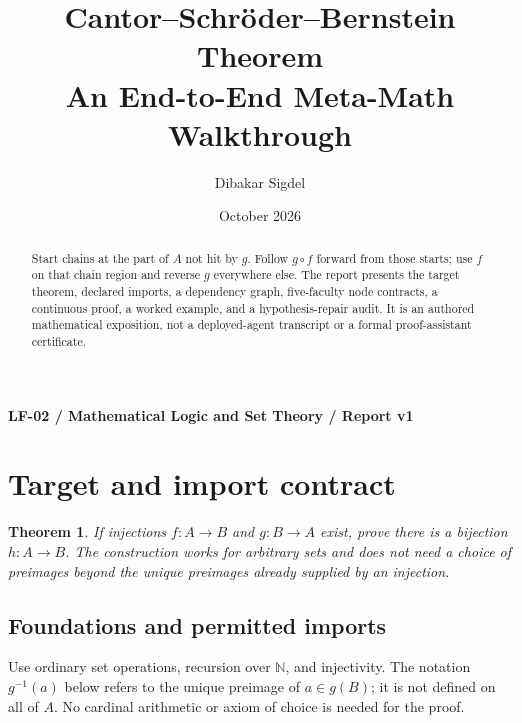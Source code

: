 \documentclass[preprint,12pt,aps,pra,showkeys,amsmath,amssymb,superscriptaddress,floatfix]{revtex4-2}
\newtheorem{theorem}{Theorem}[section]
\theoremstyle{definition}
\theoremstyle{remark}
\begin{document}
\title{Cantor--Schröder--Bernstein Theorem\\[4pt]\large An End-to-End Meta-Math Walkthrough}

\author{Dibakar Sigdel}


\date{October 2026}

\begin{abstract}

Start chains at the part of \(A\) not hit by \(g\). Follow \(g\circ f\)
forward from those starts; use \(f\) on that chain region and reverse
\(g\) everywhere else. The report presents the target theorem, declared
imports, a dependency graph, five-faculty node contracts, a continuous
proof, a worked example, and a hypothesis-repair audit. It is an
authored mathematical exposition, not a deployed-agent transcript or a
formal proof-assistant certificate.

\end{abstract}\maketitle\linespread{1.12}\selectfont

\noindent\textbf{LF-02 / Mathematical Logic and Set Theory / Report v1}

\section{Target and import contract}

\begin{theorem}

If injections \(f:A\to B\) and \(g:B\to A\) exist, prove there is a
bijection \(h:A\to B\). The construction works for arbitrary sets and
does not need a choice of preimages beyond the unique preimages already
supplied by an injection.

\end{theorem}

\subsection{Foundations and permitted imports}

Use ordinary set operations, recursion over \(\mathbb N\), and
injectivity. The notation \(g^{-1}(a)\) below refers to the unique
preimage of \(a\in g(B)\); it is not defined on all of \(A\). No
cardinal arithmetic or axiom of choice is needed for the proof.
\end{document}
